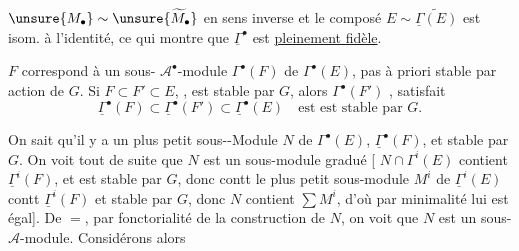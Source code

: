 
$\unsure{M_\bullet}\sim\unsure{\widetilde M_\bullet}$ en sens inverse  et le composé  $E\sim\widetilde{\underline{\Gamma}(E)}$ est isom. à l'identité, ce qui montre que $\underline{\Gamma}^\bullet$ est \uline{pleinement fidèle}.

$F$ correspond à un sous- $\mathcal A^\bullet$-module $\Gamma^\bullet(F)$ de $\Gamma^\bullet(E)$, pas à priori stable par action de $G$. Si   $F\subset F'\subset E$, , est stable par $G$, alors $\Gamma^\bullet(F')$ , satisfait
\[
\underline{\Gamma}^\bullet(F)\subset\underline{\Gamma}^\bullet(F')\subset\underline{\Gamma}^\bullet(E)\quad\text{est est stable par }G.
\]

On sait qu'il y a un plus petit sous--Module $N$ de $\Gamma^\bullet(E)$,  $\underline{\Gamma}^\bullet(F)$, et stable par $G$. On voit tout de suite que $N$ est un sous-module gradué [ $N\cap\Gamma^i(E)$ contient $\underline{\Gamma}^i(F)$, et est stable par $G$, donc contt le plus petit sous-module $M^i$ de $\underline{\Gamma}^i(E)$ contt $\underline{\Gamma}^i(F)$ et stable par $G$, donc $N$ contient $\sum M^i$, d'où par minimalité lui est égal]. De $=$, par fonctorialité de la construction de $N$, on voit que $N$ est un sous-$\mathcal A$-module. Considérons alors

